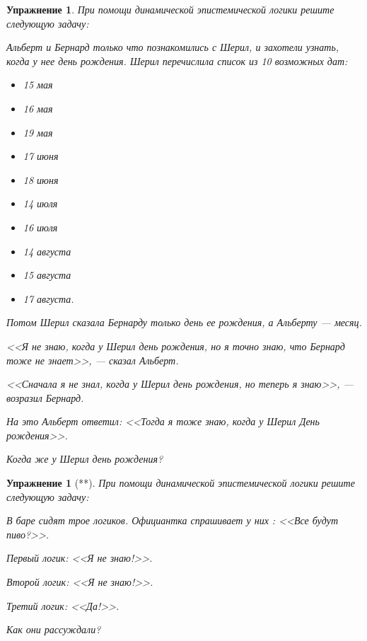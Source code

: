 \documentclass[11pt]{article}
\newtheorem{exercise}[theorem]{Упражнение}
\begin{document}
\begin{exercise} При помощи динамической эпистемической логики решите следующую задачу:

Альберт и Бернард только что познакомились с Шерил, и захотели узнать, когда у нее день рождения. Шерил перечислила список из 10 возможных дат: 

\begin{multicols}{3}
\begin{itemize}
\item 15 мая
\item 16 мая
\item 19 мая
\item 17 июня
\item 18 июня 
\item 14 июля 
\item 16 июля 
\item 14 августа
\item 15 августа 
\item 17 августа.	
\end{itemize}
\end{multicols}
 Потом Шерил сказала Бернарду только день ее рождения, а Альберту — месяц.  
 
 \begin{description}
 \item 	 <<Я не знаю, когда у Шерил день рождения, но я точно знаю, что Бернард тоже не знает>>, — сказал Альберт.
 \item <<Сначала я не знал, когда у Шерил день рождения, но теперь я знаю>>, — возразил Бернард.
 \item На это Альберт ответил: <<Тогда я тоже знаю, когда у Шерил День рождения>>. 
 \end{description}

 \begin{center}
 Когда же у Шерил день рождения?  	
 \end{center}

\end{exercise}


\begin{exercise}[**] При помощи динамической эпистемической логики решите следующую задачу:

В баре сидят трое логиков. Официантка спрашивает у них : <<Все будут пиво?>>.
\begin{description}
\item Первый логик: <<Я не знаю!>>. 
\item Второй логик: <<Я не знаю!>>. 
\item Третий логик: <<Да!>>. 
\end{description}

 \begin{center}
 Как они рассуждали?	
 \end{center}
 
\end{exercise}
\end{document}
